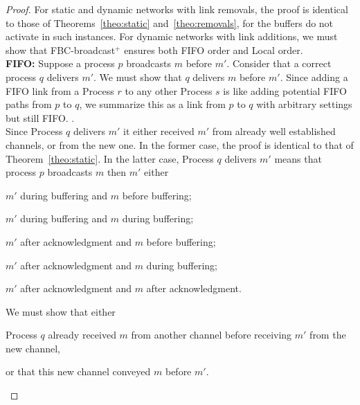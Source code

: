 \begin{proof}
  For static and dynamic networks with link removals, the proof is identical to
  those of Theorems~\ref{theo:static} and~\ref{theo:removals}, for the buffers
  do not activate in such instances. For dynamic networks with link additions,
  we must show that FBC-broadcast$^+$ ensures both
  FIFO order and Local order. \\
  \textbf{FIFO:} Suppose a process $p$ broadcasts $m$ before $m'$. Consider that
  a correct process $q$ delivers $m'$. We must show that $q$ delivers $m$ before
  $m'$.  Since adding a FIFO link from a Process $r$ to any other Process $s$ is
  like adding potential FIFO paths from $p$ to $q$, we summarize this as a link
  from $p$ to $q$ with arbitrary settings but still FIFO.  . \\   
  Since Process $q$ delivers $m'$ it either received $m'$ from already well
  established channels, or from the new one. In the former case, the proof is
  identical to that of Theorem~\ref{theo:static}. In the latter case, Process
  $q$ delivers $m'$ means that process $p$ broadcasts $m$ then $m'$ either
  \begin{inparaenum}[(i)]
  \item \label{case:one} $m'$ during buffering and $m$ before buffering;
  \item \label{case:two} $m'$ during buffering and $m$ during buffering;
  \item \label{case:three} $m'$ after acknowledgment and $m$ before buffering;
  \item \label{case:four} $m'$ after acknowledgment and $m$ during buffering;
  \item \label{case:five} $m'$ after acknowledgment and $m$ after acknowledgment.
  \end{inparaenum}
  We must show that either 
  \begin{inparaenum}[(1)]
  \item \label{show:one} Process $q$ already received $m$ from another channel
    before receiving $m'$ from the new channel,
  \item \label{show:two} or that this new channel conveyed $m$ before $m'$.
  \end{inparaenum}


\end{proof}
